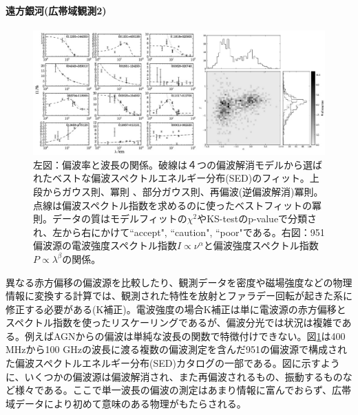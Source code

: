 \paragraph{遠方銀河(広帯域観測2)}

\begin{figure}[tbp]
\begin{center}
\includegraphics[width=0.9\linewidth]{magnetism/c06.s2.ss3.f1.eps}
\end{center}
\caption{
左図：偏波率と波長の関係\citep{2014ApJS..212...15F}。破線は４つの偏波解消モデルから選ばれたベストな偏波スペクトルエネルギー分布(SED)のフィット。上段からガウス則\citep{1966MNRAS.133...67B}、冪則 \citep{1991MNRAS.250..726T}、部分ガウス則\citep{2008A&A...487..865R}、再偏波(逆偏波解消)冪則\citep{2012ApJ...747L..24H, 2012AJ....144..105H}。点線は偏波スペクトル指数を求めるのに使ったベストフィットの冪則。データの質はモデルフィットの$\chi^2$やKS-testのp-valueで分類され、左から右にかけて``accept", ``caution", ``poor"である。右図：951偏波源の電波強度スペクトル指数$I\propto \nu^\alpha$と偏波強度スペクトル指数$P\propto \lambda^\beta$の関係。
}\label{c06.s2.ss3.f1}
\end{figure}

異なる赤方偏移の偏波源を比較したり、観測データを密度や磁場強度などの物理情報に変換する計算では、観測された特性を放射とファラデー回転が起きた系に修正する必要がある(K補正)。電波強度の場合K補正は単に電波源の赤方偏移とスペクトル指数を使ったリスケーリングであるが、偏波分光では状況は複雑である。例えばAGNからの偏波は単純な波長の関数で特徴付けできない。図\ref{c06.s2.ss3.f1}は400 MHzから100 GHzの波長に渡る複数の偏波測定を含んだ951の偏波源で構成された偏波スペクトルエネルギー分布(SED)カタログの一部である\citep{2014ApJS..212...15F}。図に示すように、いくつかの偏波源は偏波解消され、また再偏波されるもの、振動するものなど様々である。ここで単一波長の偏波の測定はあまり情報に富んでおらず、広帯域データにより初めて意味のある物理がもたらされる。


